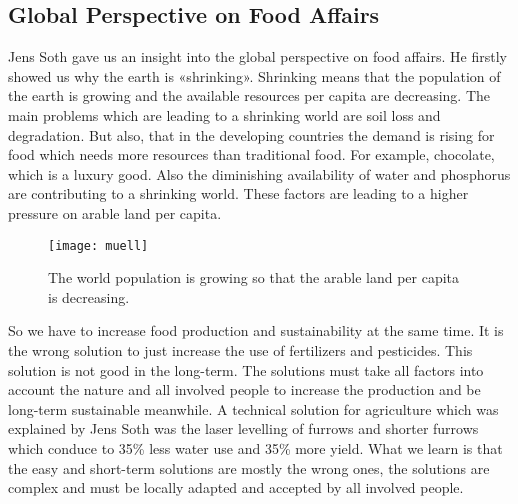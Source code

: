 \subsection{Global Perspective on Food Affairs }
Jens Soth gave us an insight into the global perspective on food affairs. He firstly showed us why the earth is «shrinking». Shrinking means that the population of the earth is growing and the available resources per capita are decreasing. The main problems which are leading to a shrinking world are soil loss and degradation. But also, that in the developing countries the demand is rising for food which needs more resources than traditional food. For example, chocolate, which is a luxury good. Also the diminishing availability of water and phosphorus are contributing to a shrinking world. These factors are leading to a higher pressure on arable land per capita.

\begin{figure}[H]	
	\centering
	\texttt{[image: muell]}
	\caption{The world population is growing so that the arable land per capita  is decreasing.}
	\label{fig:ha}
\end{figure}
So we have to increase food production and sustainability at the same time. It is the wrong solution to just increase the use of fertilizers and pesticides. This solution is not good in the long-term. The solutions must take all factors into account the nature and all involved people to increase the production and be long-term sustainable meanwhile. A technical solution for agriculture which was explained by Jens Soth was the laser levelling of furrows and shorter furrows which conduce to 35\% less water use and 35\% more yield. 
What we learn is that the easy and short-term solutions are mostly the wrong ones, the solutions are complex and must be locally adapted and accepted by all involved people.
